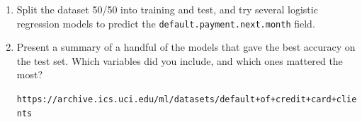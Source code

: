\documentclass[12pt]{book}
\theoremstyle{definition}
\begin{document}
\begin{enumerate}
\item
Split the dataset 50/50 into training and test, and try several logistic regression models to predict the \texttt{default.payment.next.month} field.  


\item
Present a summary of a handful of the models that gave the best accuracy on the test set.  Which variables did you include, and which ones mattered the most?




\texttt{https://archive.ics.uci.edu/ml/datasets/default+of+credit+card+clients}

\end{enumerate}
\end{document}
